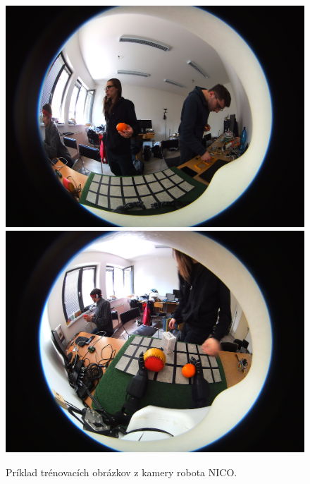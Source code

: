 \begin{figure}[H]
\includegraphics[width=\textwidth]{images/2023-04-17-140320_1.jpg}
\includegraphics[width=\textwidth]{images/2023-04-17-140935_99.jpg}
\centering
\caption{Príklad trénovacích obrázkov z kamery robota NICO.}
\label{fig:image700}
\end{figure}

